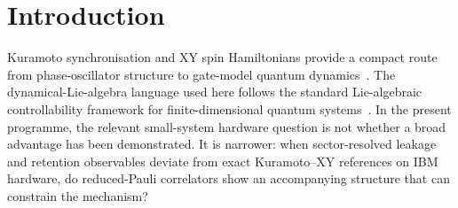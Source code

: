 \documentclass[preprint,aps,physrev,superscriptaddress,floatfix,longbibliography]{revtex4-2}
\begin{document}
\begin{abstract}
while the FIM control improves. A same-layout Kingston statistical repeat
preserves this DLA-worsens/FIM-improves separation. Larger $n=6,8$
reduced-Pauli/ZNE lanes on Fez and Marrakesh then address the ``all hardware is
$n=4$'' limitation with 36 reduced-Pauli channels per lane. A Kingston
larger-width replication adds the third backend, and a Marrakesh $n=8$ repeat
checks the largest readout-sensitivity effect. The readout-mitigated
linear-ZNE mean absolute deviations range from 0.0980 to 0.1577 on Fez, from
0.0604 to 0.0688 on Marrakesh after a large readout-sensitivity correction,
and from 0.1504 to 1.6735 on Kingston, where the $n=6$ full-readout assignment
matrix is singular and therefore reported with a pseudo-inverse sensitivity
boundary. The result is a
mechanism-boundary measurement:
it shows structured reduced-Pauli distortions accompanying the small-system
DLA/FIM hardware programme, but does not claim scalable tomography, quantum
advantage, full-state reconstruction, or backend-general entanglement
dynamics.
\end{abstract}

\maketitle

\section{Introduction}

Kuramoto synchronisation and XY spin Hamiltonians provide a compact route from
phase-oscillator structure to gate-model quantum
dynamics~\cite{Kuramoto1975,Acebron2005}. The dynamical-Lie-algebra language
used here follows the standard Lie-algebraic controllability framework for
finite-dimensional quantum systems~\cite{DAlessandro2007}.
In the present programme, the relevant small-system hardware question is not
whether a broad advantage has been demonstrated. It is narrower: when
sector-resolved leakage and retention observables deviate from exact
Kuramoto--XY references on IBM hardware, do reduced-Pauli correlators show an
accompanying structure that can constrain the mechanism?
\end{document}
